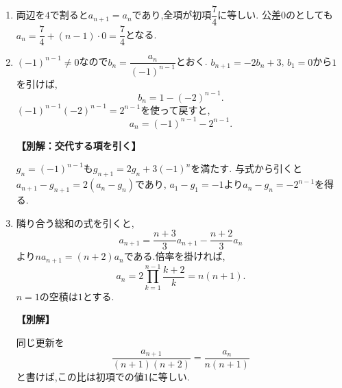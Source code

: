 \begin{enumerate}[label=\textbf{問\arabic*.},leftmargin=3.8em,format=\bookitemlink{practice-basic}{solution}{problem}]
          \item 両辺を$4$で割ると$a_{n+1}=a_n$であり,全項が初項$\dfrac{7}{4}$に等しい.
                  公差$0$のとしても$a_n=\dfrac{7}{4}+(n-1)\cdot0=\dfrac{7}{4}$となる.

          \item $(-1)^{n-1}\ne0$なので$b_n=\dfrac{a_n}{(-1)^{n-1}}$とおく.
                  $b_{n+1}=-2b_n+3$, $b_1=0$から$1$を引けば,
                  \[
                    b_n=1-(-2)^{n-1}.
                  \]
                  $(-1)^{n-1}(-2)^{n-1}=2^{n-1}$を使って戻すと,
                  \[
                    a_n=(-1)^{n-1}-2^{n-1}.
                  \]
                  \par\smallskip\noindent\textbf{【別解：交代する項を引く】}\par
                  $g_n=(-1)^{n-1}$も$g_{n+1}=2g_n+3(-1)^n$を満たす.
                  与式から引くと$a_{n+1}-g_{n+1}=2(a_n-g_n)$であり,
                  $a_1-g_1=-1$より$a_n-g_n=-2^{n-1}$を得る.

          \item 隣り合う総和の式を引くと,
                  \[
                    a_{n+1}=\frac{n+3}3a_{n+1}-\frac{n+2}3a_n
                  \]
                  より$na_{n+1}=(n+2)a_n$である.倍率を掛ければ,
                  \[
                    a_n=2\prod_{k=1}^{n-1}\frac{k+2}{k}=n(n+1).
                  \]
                  $n=1$の空積は$1$とする.
                  \par\smallskip\noindent\textbf{【別解】}\par
                  同じ更新を
                  \[
                    \frac{a_{n+1}}{(n+1)(n+2)}=\frac{a_n}{n(n+1)}
                  \]
                  と書けば,この比は初項での値$1$に等しい.
        \end{enumerate}
